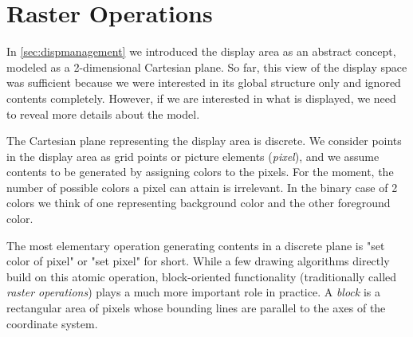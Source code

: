 \section{Raster Operations}
\label{sec:raster-ops}
In \ref{sec:dispmanagement} we introduced the display area as an abstract concept, modeled as
a 2-dimensional Cartesian plane. So far, this view of the display space was sufficient
because we were interested in its global structure only and ignored contents completely. However,
if we are interested in what is displayed, we need to reveal more details about the model.

The Cartesian plane representing the display area is discrete. We consider points in the display
area as grid points or picture elements (\emph{pixel}), and we assume contents to be generated
by assigning colors to the pixels. For the moment, the number of possible colors a pixel can attain
is irrelevant. In the binary case of 2 colors we think of one representing background color
and the other foreground color.

The most elementary operation generating contents in a discrete plane is "set color of pixel"
or "set pixel" for short. While a few drawing algorithms directly build on this atomic operation,
block-oriented functionality (traditionally called \emph{raster operations})
plays a much more important role in practice. A \emph{block} is a rectangular area of pixels
whose bounding lines are parallel to the axes of the coordinate system.

